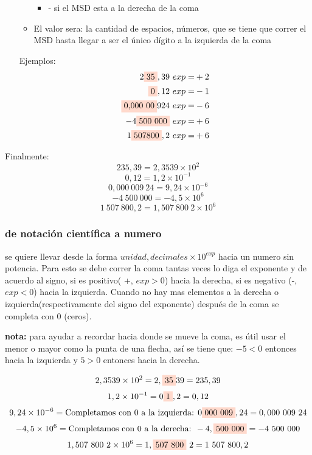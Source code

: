 \begin{enumerate}
\begin{itemize}
\begin{itemize}
                        \item - si el MSD esta a la derecha de la coma \comillas{,}
                    \end{itemize}
                \item El valor sera: la cantidad de espacios, números, que se tiene
                    que correr el MSD hasta llegar a ser el único dígito a la izquierda
                    de la coma \comillas{,}
            \end{itemize}
            Ejemplos:
            \begin{align*}
                2 \colorbox{RojoClaro}{35},39\ exp=&+2\\  \colorbox{RojoClaro}{0},12\ exp=&-1\\
                 \colorbox{RojoClaro}{0,000\ 00}924\ exp=&-6\\ -4 \colorbox{RojoClaro}{500\ 000}\ exp=&+6\\1 \colorbox{RojoClaro}{507800},2\ exp=&+6
            \end{align*}




    \end{enumerate}
    Finalmente:
        $$235,39=2,3539 \times10^{2}$$
        $$0,12 = 1,2 \times10^{-1}$$
        $$0,000\ 009\ 24 = 9,24 \times10^{-6}$$
        $$-4\ 500\ 000 = -4,5 \times10^{6}$$
        $$1\ 507\ 800,2 = 1,507\ 800\ 2 \times10^{6}$$


\subsubsection*{de notación científica a numero}
    se quiere llevar desde la forma $unidad, decimales \times10^{exp}$ hacia un
    numero sin potencia. Para esto se debe correr la coma tantas veces lo diga
    el exponente y de acuerdo al signo, si es positivo( +, $exp>0$) hacia la derecha, si es
    negativo (-, $exp<0$) hacia la izquierda. Cuando no hay mas elementos a la derecha
    o izquierda(respectivamente del signo del exponente) después de la coma se
    completa con 0 (ceros).

    \textbf{nota:} para ayudar a recordar hacia donde se mueve la coma, es útil
    usar el menor o mayor como la punta de una flecha, así se tiene que:
    $-5<0$ entonces hacia la izquierda y $5>0$ entonces hacia la derecha.

        $$2,3539 \times10^{2}= 2,\colorbox{RojoClaro}{35}39 = 235,39 $$
        $$1,2 \times10^{-1} = 0\colorbox{RojoClaro}{1},2 = 0,12  $$
        $$9,24 \times10^{-6}=\text{Completamos con 0 a la izquierda: } 0\colorbox{RojoClaro}{000\ 009},24 =0,000\ 009\ 24  $$
        $$-4,5 \times10^{6}=\text{Completamos con 0 a la derecha: }-4,\colorbox{RojoClaro}{500\ 000}=-4\ 500\ 000  $$
        $$1,507\ 800\ 2 \times10^{6}= 1, \colorbox{RojoClaro}{507\ 800}\ 2= 1\ 507\ 800,2  $$



